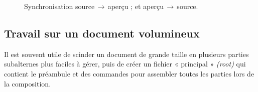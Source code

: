 \documentclass[11pt,french]{article}
\newcommand{\To}{\,\(\to\)\,}
\begin{document}
\begin{figure}
\centering
{}%
\hfill%
%
\caption[Source/Preview Synch.]{
 Synchronisation source\To aperçu ; et
 aperçu\To source.}
\label{SourcePreviewSync}
\end{figure}

\subsection{Travail sur un document volumineux}\label{secroot} 

Il est souvent utile de scinder un document de grande taille en plusieurs parties subalternes plus faciles à gérer, puis de créer un fichier « principal » \emph{(root)} qui contient le préambule et des commandes \verb|| pour assembler toutes les parties lors de la composition.
\end{document}
